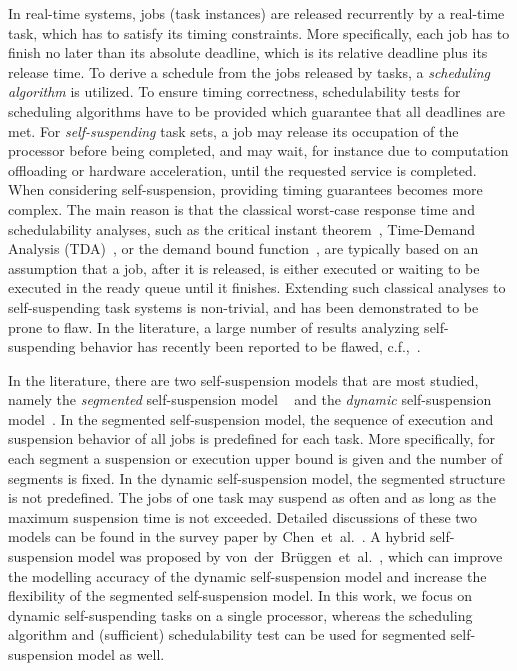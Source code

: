 \documentclass[conference]{IEEEtran}
\theoremstyle{definition}
\theoremstyle{remark}
\begin{document}
	In real-time systems, jobs (task instances) are released
    recurrently by a real-time task, which has to satisfy its timing
    constraints.  More specifically, each job has to finish no
    later than its absolute deadline, which is its relative deadline
    plus its release time.  To derive a schedule from the jobs
    released by tasks, a \emph{scheduling algorithm} is utilized.  To
    ensure timing correctness, schedulability tests for scheduling
    algorithms have to be provided which guarantee that all deadlines
    are met.  For \emph{self-suspending} task sets, a job may release
    its occupation of the processor before being completed, and may
    wait, for instance due to computation offloading or hardware
    acceleration, until the requested service is completed.  When
    considering self-suspension, providing timing guarantees becomes
    more complex. The main reason is that the classical worst-case
    response time and schedulability analyses, such as the critical
    instant theorem~\cite{liu73scheduling}, Time-Demand Analysis (TDA)~\cite{joseph86responsetimes,lehoczky-1989}, or the demand bound
    function~\cite{baruah_sporadic}, are typically based on an
    assumption that a job, after it is released, is either executed or
    waiting to be executed in the ready queue until it finishes.
    Extending such classical analyses to self-suspending task systems
    is non-trivial, and has been demonstrated to be prone to flaw. In
    the literature, a large number of results analyzing
    self-suspending behavior has recently been reported to be
    flawed, c.f.,~\cite{suspension-review-jj, DBLP:journals/rts/GunzelC20, gunzel2021note}.
	
	In the literature, there are two self-suspension models that are most studied, namely the \emph{segmented} self-suspension model ~\cite{RTCSA-BletsasA05, RTSS-ChenL14, Huang:multiseg,DBLP:conf/rtcsa/PengF16,WC16-suspend-DATE, Kim2016,DBLP:conf/ecrts/ChenHHMB19,ecrts15nelissen} and the \emph{dynamic} self-suspension model~\cite{ECRTS-AudsleyB04, huangpass:dac2015, LiuChen:rtss2014,ChenECRTS2016-suspension,DBLP:conf/ecrts/Devi03,guenzel2020sched_test_edf}.
	In the segmented self-suspension model, the sequence of execution and suspension behavior of all jobs is predefined for each task.
	More specifically, for each segment a suspension or execution upper bound is given and the number of segments is fixed.
	In the dynamic self-suspension model, the segmented structure is
    not predefined. 	The jobs of one task may suspend as often and
    as long as the maximum suspension time is not exceeded. Detailed
    discussions of these two models can be found in the survey paper
    by Chen~et~al.~\cite{suspension-review-jj}. A hybrid self-suspension model was
    proposed by von~der~Br\"uggen~et~al.~\cite{vdBrueggen-RTCSA2017}, which can improve the modelling accuracy of the dynamic
    self-suspension model and increase the flexibility of the segmented self-suspension model.
	In this work, we focus on dynamic self-suspending tasks on a single processor, whereas the scheduling algorithm and (sufficient) schedulability test can be used for segmented self-suspension model as well.
	
\end{document}
